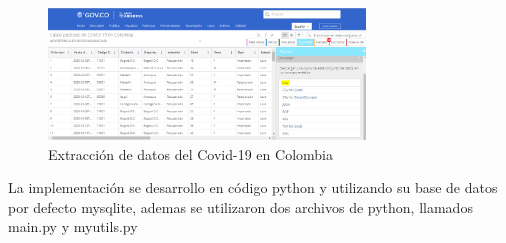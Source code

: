 \documentclass[conference,compsoc,onecolumn]{IEEEtran}
\begin{document}
            \begin{figure}[H]
            \centering
            \includegraphics[width=0.75\textwidth]{Figures/Extraccion.PNG}
            \caption{Extracción de datos del Covid-19 en Colombia}
            \label{fig:grafica.png}
        \end{figure}


\label{sec:results}
\singlespacing
La implementación se desarrollo en código python y utilizando su base de datos por defecto mysqlite, ademas se utilizaron dos archivos de python, llamados main.py y myutils.py
\end{document}
